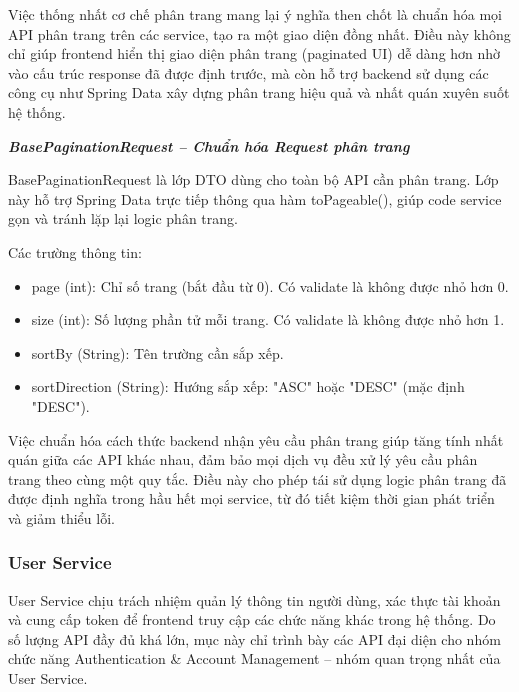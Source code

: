 Việc thống nhất cơ chế phân trang mang lại ý nghĩa then chốt là chuẩn hóa mọi API phân trang trên các service, tạo ra một giao diện đồng nhất. Điều này không chỉ giúp frontend hiển thị giao diện phân trang (paginated UI) dễ dàng hơn nhờ vào cấu trúc response đã được định trước, mà còn hỗ trợ backend sử dụng các công cụ như Spring Data xây dựng phân trang hiệu quả và nhất quán xuyên suốt hệ thống.

\textbf{\textit{BasePaginationRequest – Chuẩn hóa Request phân trang}}

BasePaginationRequest là lớp DTO dùng cho toàn bộ API cần phân trang. Lớp này hỗ trợ Spring Data trực tiếp thông qua hàm toPageable(), giúp code service gọn và tránh lặp lại logic phân trang.

Các trường thông tin:
\begin{itemize}
    \item page (int): Chỉ số trang (bắt đầu từ 0). Có validate là không được nhỏ hơn 0.
    \item size (int): Số lượng phần tử mỗi trang. Có validate là không được nhỏ hơn 1.
    \item sortBy (String): Tên trường cần sắp xếp.
    \item sortDirection (String): Hướng sắp xếp: "ASC" hoặc "DESC" (mặc định "DESC").
\end{itemize}

Việc chuẩn hóa cách thức backend nhận yêu cầu phân trang giúp tăng tính nhất quán giữa các API khác nhau, đảm bảo mọi dịch vụ đều xử lý yêu cầu phân trang theo cùng một quy tắc. Điều này cho phép tái sử dụng logic phân trang đã được định nghĩa trong hầu hết mọi service, từ đó tiết kiệm thời gian phát triển và giảm thiểu lỗi.

\subsubsection{User Service}

User Service chịu trách nhiệm quản lý thông tin người dùng, xác thực tài khoản và cung cấp token để frontend truy cập các chức năng khác trong hệ thống. Do số lượng API đầy đủ khá lớn, mục này chỉ trình bày các API đại diện cho nhóm chức năng Authentication \& Account Management – nhóm quan trọng nhất của User Service.

